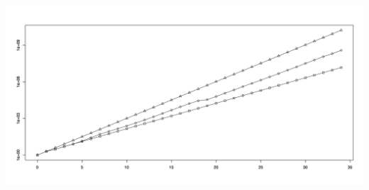 \documentclass{pracamgr}
\begin{document}
     \begin{center}%
      \includegraphics[scale=0.37]{img/plot1.jpg}
     \end{center}

    
 
  
\end{document}
